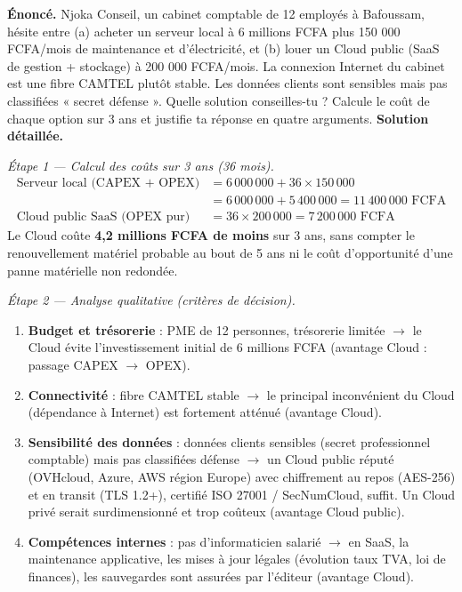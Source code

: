 \documentclass[11pt]{article}
\begin{document}
\begin{exoresolu}
\textbf{Énoncé.} Njoka Conseil, un cabinet comptable de 12 employés à Bafoussam, hésite entre (a) acheter un serveur local à 6 millions FCFA plus 150 000 FCFA/mois de maintenance et d'électricité, et (b) louer un Cloud public (SaaS de gestion + stockage) à 200 000 FCFA/mois. La connexion Internet du cabinet est une fibre CAMTEL plutôt stable. Les données clients sont sensibles mais pas classifiées « secret défense ». Quelle solution conseilles-tu ? Calcule le coût de chaque option sur 3 ans et justifie ta réponse en quatre arguments.
\tcblower
\textbf{Solution détaillée.}

\emph{Étape 1 — Calcul des coûts sur 3 ans (36 mois).}
\begin{align*}
\text{Serveur local (CAPEX + OPEX)} &= 6\,000\,000 + 36 \times 150\,000 \\
&= 6\,000\,000 + 5\,400\,000 = 11\,400\,000 \text{ FCFA}\\[4pt]
\text{Cloud public SaaS (OPEX pur)} &= 36 \times 200\,000 = 7\,200\,000 \text{ FCFA}
\end{align*}
Le Cloud coûte \textbf{4,2 millions FCFA de moins} sur 3 ans, sans compter le renouvellement matériel probable au bout de 5 ans ni le coût d'opportunité d'une panne matérielle non redondée.

\emph{Étape 2 — Analyse qualitative (critères de décision).}
\begin{enumerate}
\item \textbf{Budget et trésorerie} : PME de 12 personnes, trésorerie limitée $\rightarrow$ le Cloud évite l'investissement initial de 6 millions FCFA (avantage Cloud : passage CAPEX $\rightarrow$ OPEX).
\item \textbf{Connectivité} : fibre CAMTEL stable $\rightarrow$ le principal inconvénient du Cloud (dépendance à Internet) est fortement atténué (avantage Cloud).
\item \textbf{Sensibilité des données} : données clients sensibles (secret professionnel comptable) mais pas classifiées défense $\rightarrow$ un Cloud public réputé (OVHcloud, Azure, AWS région Europe) avec chiffrement au repos (AES-256) et en transit (TLS 1.2+), certifié ISO 27001 / SecNumCloud, suffit. Un Cloud privé serait surdimensionné et trop coûteux (avantage Cloud public).
\item \textbf{Compétences internes} : pas d'informaticien salarié $\rightarrow$ en SaaS, la maintenance applicative, les mises à jour légales (évolution taux TVA, loi de finances), les sauvegardes sont assurées par l'éditeur (avantage Cloud).
\end{enumerate}


\end{exoresolu}
\end{document}
